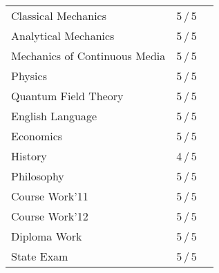 \documentclass[a4paper,10pt]{article}
\begin{document}
\begin{center}
\begin{tabular}{lcc}
Classical Mechanics &5\,/\,5 \\
Analytical Mechanics &5\,/\,5 \\
Mechanics of Continuous Media &5\,/\,5 \\
Physics &5\,/\,5\\
Quantum Field Theory &5\,/\,5\\

English Language &5\,/\,5 \\
Economics &5\,/\,5 \\
History &4\,/\,5 \\
Philosophy &5\,/\,5 \\

Course Work'11 & 5\,/\,5 \\
Course Work'12 & 5\,/\,5 \\
Diploma Work & 5\,/\,5 \\
State Exam &  5\,/\,5 \\

\end{tabular}
\end{center}
\end{document}

